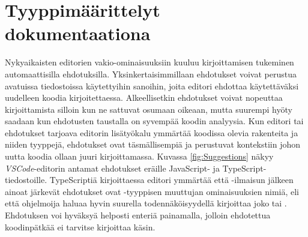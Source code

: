 \section{Tyyppimäärittelyt dokumentaationa}
Nykyaikaisten editorien vakio-ominaisuuksiin kuuluu kirjoittamisen tukeminen\newline
automaattisilla ehdotuksilla. Yksinkertaisimmillaan ehdotukset voivat
perustua avatuissa tiedostoissa käytettyihin sanoihin, joita editori ehdottaa
käytettäväksi uudelleen koodia kirjoitettaessa. Alkeellisetkin ehdotukset
voivat nopeuttaa kirjoittamista silloin kun ne sattuvat osumaan oikeaan,
mutta suurempi hyöty saadaan kun ehdotusten taustalla on syvempää koodin
analyysia. Kun editori tai ehdotukset tarjoava editorin lisätyökalu ymmärtää
koodissa olevia rakenteita ja niiden tyyppejä, ehdotukset ovat
täsmällisempiä ja perustuvat kontekstiin johon uutta koodia ollaan juuri
kirjoittamassa. Kuvassa \ref{fig:Suggestions} näkyy
\textit{VSCode}-editorin antamat ehdotukset eräille JavaScript-
ja TypeScript-tiedostoille.
TypeScriptiä kirjoittaessa editori ymmärtää että -ilmaisun
jälkeen ainoat järkevät ehdotukset ovat -tyyppisen muuttujan
ominaisuuksien nimiä, eli että ohjelmoija haluaa hyvin suurella todennäköisyydellä
kirjoittaa joko  tai .
Ehdotuksen voi hyväksyä helposti enteriä painamalla, jolloin ehdotettua
koodinpätkää ei tarvitse kirjoittaa käsin.

